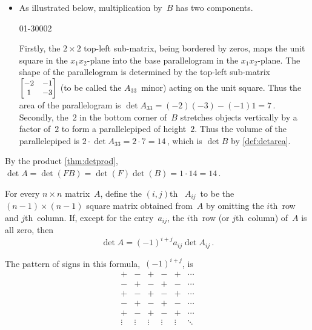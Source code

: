 \begin{example}
\begin{solution}
\begin{itemize}
\begin{itemize}
\item As illustrated  below, multiplication by~\(B\) has two components.
\begin{center}
01{-3}000{2}
\end{center}
Firstly,  the \(2\times2\) top-left sub-matrix, being bordered by zeros, maps the unit square in the \(x_1x_2\)-plane into the base parallelogram in the \(x_1x_2\)-plane.
The shape of the parallelogram is determined by the top-left sub-matrix \(\small\begin{bmatrix} -2&-1\\1&-3 \end{bmatrix}\) (to be called the \(A_{33}\)~minor) acting on the unit square.
Thus the area of the parallelogram is \(\det A_{33}=(-2)(-3)-(-1)1=7\)\,.
Secondly, the~\(2\) in the bottom corner of~\(B\) stretches objects vertically by a factor of~\(2\) to form a parallelepiped of height~\(2\).
Thus the volume of the parallelepiped is \(2\cdot\det A_{33}=2\cdot 7=14\)\,, which is \(\det B\) by \autoref{def:detarea}.

\end{itemize}
By the product \autoref{thm:detprod},
\(\det A=\det(FB)=\det(F)\det(B)=1\cdot14=14\)\,.

\end{itemize}
\end{solution}
\end{example}











\begin{theorem} \label{thm:rpdet:vii} 
For every \(n\times n\) matrix~\(A\),
define the \((i,j)\)th~ \(A_{ij}\)~to be the \((n-1)\times(n-1)\) square matrix obtained from~\(A\) by omitting the \(i\)th~row and \(j\)th~column.  
If, except for the entry~\(a_{ij}\), the \(i\)th~row (or \(j\)th~column) of~\(A\) is all zero, then 
\begin{equation}
\det A=(-1)^{i+j}a_{ij}\det A_{ij}\,.
\label{eq:rpdet:vii}
\end{equation}
\end{theorem}
The pattern of signs in this formula,~\((-1)^{i+j}\), is 
\begin{equation*}
\begin{matrix} +&-&+&-&+&\cdots
\\-&+&-&+&-&\cdots
\\+&-&+&-&+&\cdots
\\-&+&-&+&-&\cdots
\\+&-&+&-&+&\cdots
\\\vdots&\vdots&\vdots&\vdots&\vdots&\ddots \end{matrix}
\end{equation*}


